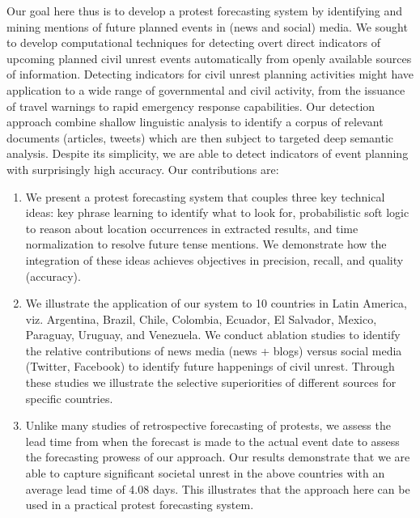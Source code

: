 Our goal here thus is to develop a protest forecasting system by identifying and mining mentions of future planned events
in (news and social) media.
We sought to develop
computational techniques for detecting overt direct indicators
of upcoming planned civil unrest events automatically from openly
available sources of information.  Detecting indicators for civil
unrest planning activities might have application to a wide range of
governmental and civil activity, from the issuance of travel warnings
to rapid emergency response capabilities.  
Our detection approach 
combine shallow linguistic analysis to identify a corpus of relevant
documents (articles, tweets) which are then subject to targeted deep semantic analysis.
Despite its simplicity, we are able to
detect indicators of event planning with surprisingly high
accuracy. 
Our contributions are:
\begin{enumerate}
\item We present a protest forecasting system that couples three key technical ideas:
key phrase learning to identify what to look for, probabilistic soft logic to reason about location occurrences in extracted results, and 
time normalization to resolve future tense mentions. We demonstrate how the integration of these ideas achieves objectives in precision,
recall, and quality (accuracy).
\item We illustrate the application of our system to 10 countries in Latin America, viz. Argentina, Brazil, Chile, Colombia, Ecuador, El Salvador, Mexico, Paraguay, Uruguay, and Venezuela. 
We conduct ablation studies to identify the 
relative contributions of news media (news + blogs) versus social media (Twitter, Facebook) to identify future happenings of
civil unrest. Through these studies we illustrate the selective superiorities of different sources for specific countries.
\item Unlike many studies of retrospective forecasting of protests,
we assess the lead time from when the forecast is made to
the actual event date to assess the forecasting prowess of our approach. 
Our results demonstrate that we are able to 
capture significant societal unrest in the above countries with an average lead time of 4.08 days. This illustrates that the
approach here can be used in a practical protest forecasting system.
\end{enumerate}

